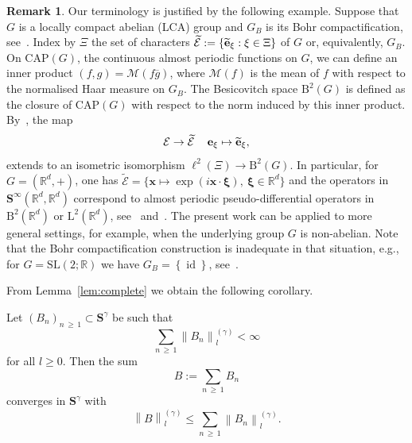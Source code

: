 \documentclass[10pt]{amsart}
\theoremstyle{definition}\newtheorem{defi}[theo]{Definition}\newtheorem{rema}[theo]{Remark}\newtheorem{exam}[theo]{Example}\newtheorem{nota}[theo]{Notation}
\DeclareMathOperator{\id}{id}
\newcommand{\RB}{\mathrm{B}}
\newcommand{\CAP}{\mathrm{CAP}}
\renewcommand{\mathsf}{\mathrm}
\newcommand{\sfB}{\mathsf{B}}
\newcommand{\sfL}{\mathsf{L}}
\newcommand{\R}{\mathbb R}
\newcommand{\CE}{\mathcal{E}}
\newcommand{\CM}{\mathcal{M}}
\newcommand{\bxi}{\boldsymbol \xi}
\newcommand{\BS}{\mathbf S}
\newcommand{\bx}{\mathbf x}
\newcommand{\be}{\mathbf e}
\newcommand{\set}[1]{\left\{ #1 \right\}}
\newcommand{\snorm}[3]{\left\| #1\right\|_{#3}^{(#2)}}
\let\oldtilde\tilde
\renewcommand*{\tilde}[1]{\mathchoice{\widetilde{#1}}{\widetilde{#1}}{\oldtilde{#1}}{\oldtilde{#1}}}
\begin{document}
\begin{rema}
Our terminology is justified by the following example. Suppose that $G$ is a locally compact abelian (LCA) group and $G_B$ is its Bohr compactification, see~\cite[\S 1]{Shubin1978}. Index by $\Xi$ the set of characters $\widetilde{\CE}:=\lbrace \tilde{\be}_\xi:\xi\in\Xi\rbrace$ of $G$ or, equivalently, $G_B$. On $\CAP(G)$, the continuous almost periodic functions on $G$, we can define an inner product $(f,g) = \CM(f\overline g)$, where $\CM(f)$ is the mean of $f$ with respect to the normalised Haar measure on $G_B$. The Besicovitch space $\RB^2(G)$ is defined as the closure of $\CAP(G)$ with respect to the norm induced by this inner product. By~\cite[Proposition~1.5]{Shubin1978}, the map
\begin{equation}
\CE\to\widetilde{\CE}\, \quad \be_\xi\mapsto\tilde{\be}_\xi,
\end{equation}
extends to an isometric isomorphism $\ell^2(\Xi)\to \sfB^2(G)$. In particular, for $G = (\R^d,+)$, one has $\widetilde{\CE}=\lbrace \bx\mapsto \exp(i \bx\cdot
\bxi),\ \bxi\in\R^d\rbrace$ and the operators in $\BS^\infty(\R^d,\R^d)$ correspond to almost periodic pseudo-differential operators in $\sfB^2(\R^d)$ or $\sfL^2(\R^d)$, see~\cite[\S 3--4]{Shubin1978} and~\cite[Equation (8.8)]{ParSht2012}. The present work can be applied to more general settings, for example, when the underlying group $G$ is non-abelian. Note that the Bohr compactification construction is inadequate in that situation, e.g., for $G = \mathrm{SL}(2;\R)$ we have $G_B = \set \id$, see~\cite[p.~4]{Shubin1978}.
\end{rema}


From Lemma~\ref{lem:complete} we obtain the following corollary.
\begin{coro}\label{cor:complete}
Let $(B_n)_{n\,\geq\,1} \subset \BS^\gamma$ be such that
\begin{equation}
\sum_{n\,\geq\,1}\snorm{B_n}{\gamma}{l}<\infty
\end{equation}
for all $l \geq 0$. Then the sum
\begin{equation}
B:=\sum_{n\,\geq\,1}B_n
\end{equation}
converges in $\BS^\gamma$ with
\begin{equation}
\snorm{B}{\gamma}{l}\leq\sum\limits_{n\,\geq\,1}\snorm{B_n}{\gamma}{l}.
\end{equation}
\end{coro}
\end{document}

